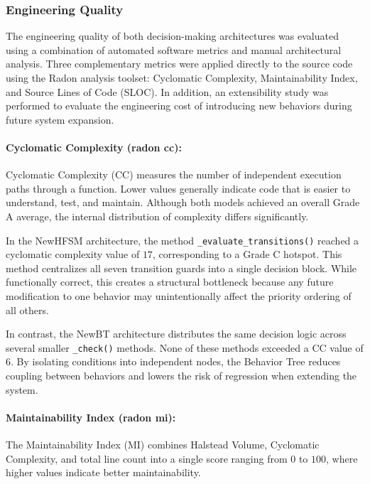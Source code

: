 \documentclass[12pt, a4paper]{report}
\begin{document}
\subsubsection{Engineering Quality}

The engineering quality of both decision-making architectures was evaluated using a combination of automated software metrics and manual architectural analysis. Three complementary metrics were applied directly to the source code using the Radon analysis toolset: Cyclomatic Complexity, Maintainability Index, and Source Lines of Code (SLOC). In addition, an extensibility study was performed to evaluate the engineering cost of introducing new behaviors during future system expansion.

\paragraph{Cyclomatic Complexity (radon cc):}

Cyclomatic Complexity (CC) measures the number of independent execution paths through a function. Lower values generally indicate code that is easier to understand, test, and maintain. Although both models achieved an overall Grade A average, the internal distribution of complexity differs significantly.

In the NewHFSM architecture, the method \texttt{\_evaluate\_transitions()} reached a cyclomatic complexity value of $17$, corresponding to a Grade C hotspot. This method centralizes all seven transition guards into a single decision block. While functionally correct, this creates a structural bottleneck because any future modification to one behavior may unintentionally affect the priority ordering of all others.

In contrast, the NewBT architecture distributes the same decision logic across several smaller \texttt{\_check()} methods. None of these methods exceeded a CC value of $6$. By isolating conditions into independent nodes, the Behavior Tree reduces coupling between behaviors and lowers the risk of regression when extending the system.

\paragraph{Maintainability Index (radon mi):}

The Maintainability Index (MI) combines Halstead Volume, Cyclomatic Complexity, and total line count into a single score ranging from $0$ to $100$, where higher values indicate better maintainability.
\end{document}

